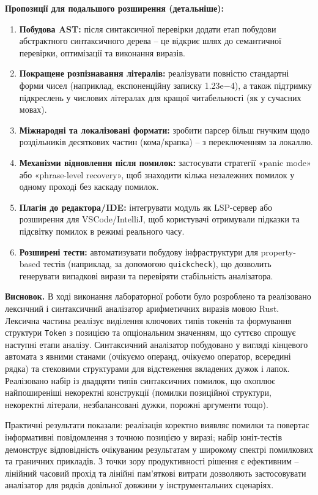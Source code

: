 \documentclass[14pt, a4paper]{extreport}
\begin{document}
	\textbf{Пропозиції для подальшого розширення (детальніше):}
	\begin{enumerate}
		\item \textbf{Побудова AST:} після синтаксичної перевірки додати етап побудови абстрактного синтаксичного дерева -- це відкриє шлях до семантичної перевірки, оптимізації та виконання виразів.
		\item \textbf{Покращене розпізнавання літералів:} реалізувати повністю стандартні форми чисел (наприклад, експоненційну записку 1.23e−4), а також підтримку підкреслень у числових літералах для кращої читабельності (як у сучасних мовах).
		\item \textbf{Міжнародні та локалізовані формати:} зробити парсер більш гнучким щодо роздільників десяткових частин (кома/крапка) -- з переключенням за локаллю.
		\item \textbf{Механізми відновлення після помилок:} застосувати стратегії «panic mode» або «phrase-level recovery», щоб знаходити кілька незалежних помилок у одному проході без каскаду помилок.
		\item \textbf{Плагін до редактора/IDE:} інтегрувати модуль як LSP-сервер або розширення для VSCode/IntelliJ, щоб користувачі отримували підказки та підсвітку помилок в режимі реального часу.
		\item \textbf{Розширені тести:} автоматизувати побудову інфраструктури для property-based тестів (наприклад, за допомогою \texttt{quickcheck}), що дозволить генерувати випадкові вирази та перевіряти стабільність аналізатора.
	\end{enumerate}
	
	\textbf{Висновок.} 
	В ході виконання лабораторної роботи було розроблено та реалізовано лексичний і синтаксичний аналізатор арифметичних виразів мовою Rust. Лексична частина реалізує виділення ключових типів токенів та формування структури \texttt{Token} з позицією та опціональним значенням, що суттєво спрощує наступні етапи аналізу. Синтаксичний аналізатор побудовано у вигляді кінцевого автомата з явними станами (очікуємо операнд, очікуємо оператор, всередині рядка) та стековими структурами для відстеження вкладених дужок і лапок. Реалізовано набір із двадцяти типів синтаксичних помилок, що охоплює найпоширеніші некоректні конструкції (помилки позиційної структури, некоректні літерали, незбалансовані дужки, порожні аргументи тощо).
	
	Практичні результати показали: реалізація коректно виявляє помилки та повертає інформативні повідомлення з точною позицією у виразі; набір юніт-тестів демонструє відповідність очікуваним результатам у широкому спектрі помилкових та граничних прикладів. З точки зору продуктивності рішення є ефективним -- лінійний часовий прохід та лінійні пам'яткові витрати дозволяють застосовувати аналізатор для рядків довільної довжини у інструментальних сценаріях.
	
\end{document}
